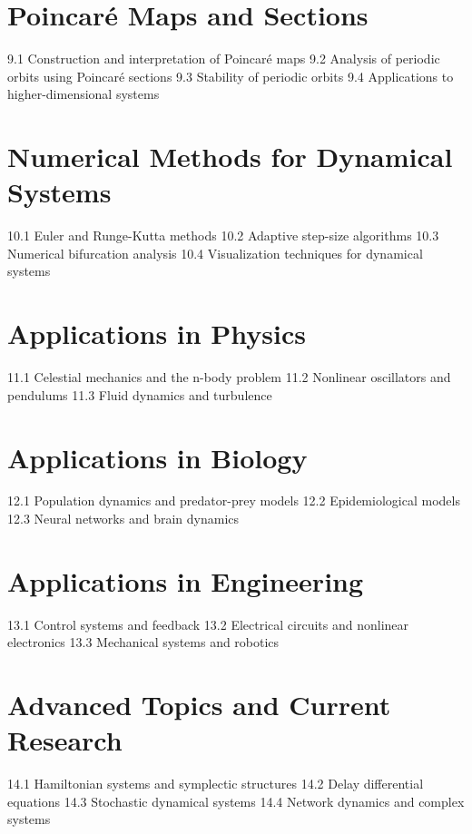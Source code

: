 \section{Poincaré Maps and Sections}
9.1 Construction and interpretation of Poincaré maps
9.2 Analysis of periodic orbits using Poincaré sections
9.3 Stability of periodic orbits
9.4 Applications to higher-dimensional systems
\section{Numerical Methods for Dynamical Systems}
10.1 Euler and Runge-Kutta methods
10.2 Adaptive step-size algorithms
10.3 Numerical bifurcation analysis
10.4 Visualization techniques for dynamical systems
\section{Applications in Physics}
11.1 Celestial mechanics and the n-body problem
11.2 Nonlinear oscillators and pendulums
11.3 Fluid dynamics and turbulence
\section{Applications in Biology}
12.1 Population dynamics and predator-prey models
12.2 Epidemiological models
12.3 Neural networks and brain dynamics
\section{Applications in Engineering}
13.1 Control systems and feedback
13.2 Electrical circuits and nonlinear electronics
13.3 Mechanical systems and robotics
\section{Advanced Topics and Current Research}
14.1 Hamiltonian systems and symplectic structures
14.2 Delay differential equations
14.3 Stochastic dynamical systems
14.4 Network dynamics and complex systems
